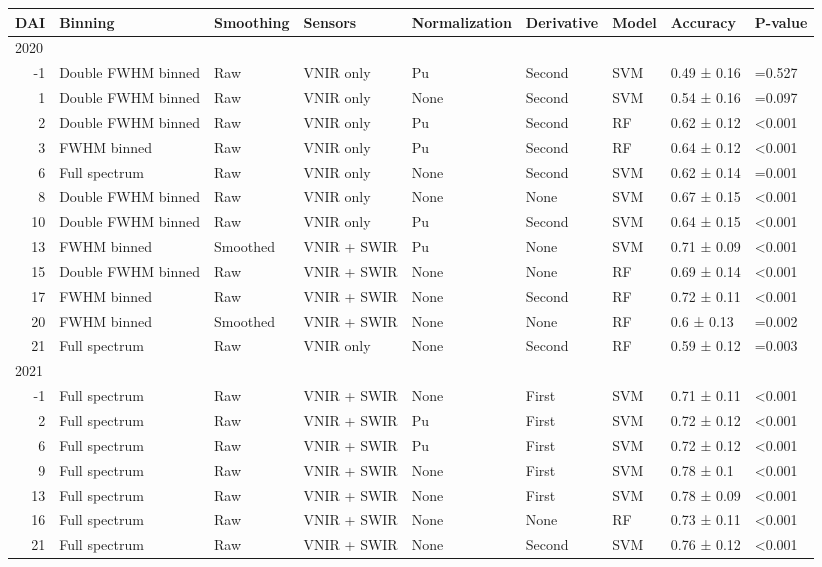 \captionsetup[table]{labelformat=empty,skip=1pt}
\begin{longtable}{rllllllll}
\toprule
DAI & Binning & Smoothing & Sensors & Normalization & Derivative & Model & Accuracy & P-value \\ 
\midrule
\multicolumn{1}{l}{2020} \\ 
\midrule
-1 & Double FWHM binned & Raw & VNIR only & Pu & Second & SVM & 0.49 ± 0.16 & =0.527 \\ 
1 & Double FWHM binned & Raw & VNIR only & None & Second & SVM & 0.54 ± 0.16 & =0.097 \\ 
2 & Double FWHM binned & Raw & VNIR only & Pu & Second & RF & 0.62 ± 0.12 & <0.001 \\ 
3 & FWHM binned & Raw & VNIR only & Pu & Second & RF & 0.64 ± 0.12 & <0.001 \\ 
6 & Full spectrum & Raw & VNIR only & None & Second & SVM & 0.62 ± 0.14 & =0.001 \\ 
8 & Double FWHM binned & Raw & VNIR only & None & None & SVM & 0.67 ± 0.15 & <0.001 \\ 
10 & Double FWHM binned & Raw & VNIR only & Pu & Second & SVM & 0.64 ± 0.15 & <0.001 \\ 
13 & FWHM binned & Smoothed & VNIR + SWIR & Pu & None & SVM & 0.71 ± 0.09 & <0.001 \\ 
15 & Double FWHM binned & Raw & VNIR + SWIR & None & None & RF & 0.69 ± 0.14 & <0.001 \\ 
17 & FWHM binned & Raw & VNIR + SWIR & None & Second & RF & 0.72 ± 0.11 & <0.001 \\ 
20 & FWHM binned & Smoothed & VNIR + SWIR & None & None & RF & 0.6 ± 0.13 & =0.002 \\ 
21 & Full spectrum & Raw & VNIR only & None & Second & RF & 0.59 ± 0.12 & =0.003 \\ 
\midrule
\multicolumn{1}{l}{2021} \\ 
\midrule
-1 & Full spectrum & Raw & VNIR + SWIR & None & First & SVM & 0.71 ± 0.11 & <0.001 \\ 
2 & Full spectrum & Raw & VNIR + SWIR & Pu & First & SVM & 0.72 ± 0.12 & <0.001 \\ 
6 & Full spectrum & Raw & VNIR + SWIR & Pu & First & SVM & 0.72 ± 0.12 & <0.001 \\ 
9 & Full spectrum & Raw & VNIR + SWIR & None & First & SVM & 0.78 ± 0.1 & <0.001 \\ 
13 & Full spectrum & Raw & VNIR + SWIR & None & First & SVM & 0.78 ± 0.09 & <0.001 \\ 
16 & Full spectrum & Raw & VNIR + SWIR & None & None & RF & 0.73 ± 0.11 & <0.001 \\ 
21 & Full spectrum & Raw & VNIR + SWIR & None & Second & SVM & 0.76 ± 0.12 & <0.001 \\ 
\bottomrule
\end{longtable}


